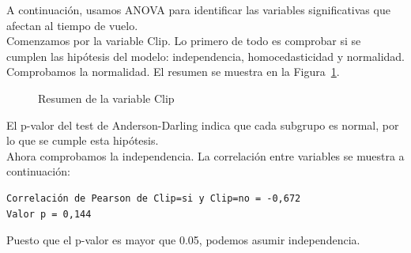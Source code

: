 \documentclass[12pt,a4paper,twoside,openright,titlepage,final]{article}
\begin{document}
A continuación, usamos ANOVA para identificar las variables significativas que afectan al tiempo de vuelo.\\

Comenzamos por la variable Clip. Lo primero de todo es comprobar si se cumplen las hipótesis del modelo: independencia, homocedasticidad y normalidad. \\

Comprobamos la normalidad. El resumen se muestra en la Figura~\ref{fig:normalidad_clip}.\\ 

\begin{figure}[htbp!]
	\centering
	\caption{Resumen de la variable Clip} \label{fig:normalidad_clip}
\end{figure}

El p-valor del test de Anderson-Darling indica que cada subgrupo es normal, por lo que se cumple esta hipótesis.\\

Ahora comprobamos la independencia. La correlación entre variables se muestra a continuación:

\begin{verbatim}
Correlación de Pearson de Clip=si y Clip=no = -0,672
Valor p = 0,144
\end{verbatim}

Puesto que el p-valor es mayor que 0.05, podemos asumir independencia.\\
\end{document}
